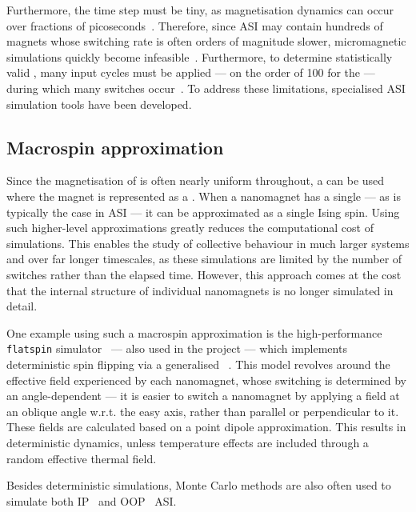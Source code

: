 Furthermore, the time step must be tiny, as magnetisation dynamics can occur over fractions of picoseconds~\cite{PhD_Leliaert}.
Therefore, since ASI may contain hundreds of magnets whose switching rate is often orders of magnitude slower, micromagnetic simulations quickly become infeasible~\cite{leo2021chiral}.
Furthermore, to determine statistically valid , many input cycles must be applied --- on the order of 100 for the  --- during which many switches occur~\cite{RC_TaskAgnosticMetrics_v2}.
To address these limitations, specialised ASI simulation tools have been developed.

\subsection{Macrospin approximation}\label{sec:1:Modelling_macrospin}
Since the magnetisation of  is often nearly uniform throughout, a  can be used where the magnet is represented as a .
When a nanomagnet has a single  --- as is typically the case in ASI --- it can be approximated as a single Ising spin.
Using such higher-level approximations greatly reduces the computational cost of simulations.
This enables the study of collective behaviour in much larger systems and over far longer timescales, as these simulations are limited by the number of switches rather than the elapsed time.
However, this approach comes at the cost that the internal  structure of individual nanomagnets is no longer simulated in detail. \par
One example using such a macrospin approximation is the high-performance \texttt{flatspin} simulator~\cite{flatspin} --- also used in the \spinengine project --- which implements deterministic spin flipping via a generalised ~\cite{StonerWohlfarth2008}.
This model revolves around the effective field experienced by each nanomagnet, whose switching is determined by an angle-dependent  --- it is easier to switch a nanomagnet by applying a field at an oblique angle w.r.t. the easy axis, rather than parallel or perpendicular to it.
These fields are calculated based on a point dipole approximation.
This results in deterministic dynamics, unless temperature effects are included through a random effective thermal field. \par
Besides deterministic simulations, Monte Carlo methods are also often used to simulate both IP~\cite{Qi2008,Cugliandolo2017,LocalizedFrustratedKagome,Brunn2021,Farhan2013,ApparentFMpinwheel} and OOP~\cite{Chioar2014,PerpendicularMagnetizationASI} ASI. %
